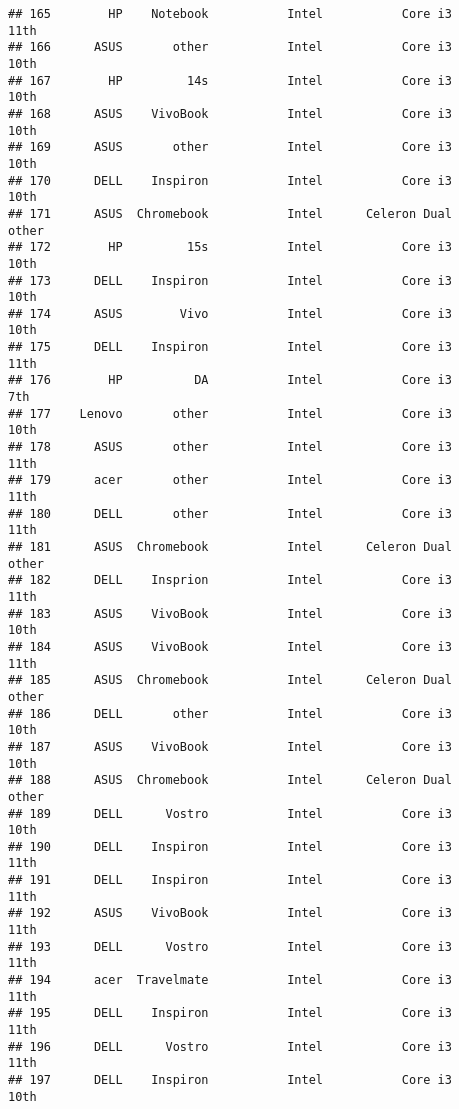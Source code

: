 \documentclass[
]{article}
\begin{document}
\begin{verbatim}
## 165        HP    Notebook           Intel           Core i3            11th
## 166      ASUS       other           Intel           Core i3            10th
## 167        HP         14s           Intel           Core i3            10th
## 168      ASUS    VivoBook           Intel           Core i3            10th
## 169      ASUS       other           Intel           Core i3            10th
## 170      DELL    Inspiron           Intel           Core i3            10th
## 171      ASUS  Chromebook           Intel      Celeron Dual           other
## 172        HP         15s           Intel           Core i3            10th
## 173      DELL    Inspiron           Intel           Core i3            10th
## 174      ASUS        Vivo           Intel           Core i3            10th
## 175      DELL    Inspiron           Intel           Core i3            11th
## 176        HP          DA           Intel           Core i3             7th
## 177    Lenovo       other           Intel           Core i3            10th
## 178      ASUS       other           Intel           Core i3            11th
## 179      acer       other           Intel           Core i3            11th
## 180      DELL       other           Intel           Core i3            11th
## 181      ASUS  Chromebook           Intel      Celeron Dual           other
## 182      DELL    Insprion           Intel           Core i3            11th
## 183      ASUS    VivoBook           Intel           Core i3            10th
## 184      ASUS    VivoBook           Intel           Core i3            11th
## 185      ASUS  Chromebook           Intel      Celeron Dual           other
## 186      DELL       other           Intel           Core i3            10th
## 187      ASUS    VivoBook           Intel           Core i3            10th
## 188      ASUS  Chromebook           Intel      Celeron Dual           other
## 189      DELL      Vostro           Intel           Core i3            10th
## 190      DELL    Inspiron           Intel           Core i3            11th
## 191      DELL    Inspiron           Intel           Core i3            11th
## 192      ASUS    VivoBook           Intel           Core i3            11th
## 193      DELL      Vostro           Intel           Core i3            11th
## 194      acer  Travelmate           Intel           Core i3            11th
## 195      DELL    Inspiron           Intel           Core i3            11th
## 196      DELL      Vostro           Intel           Core i3            11th
## 197      DELL    Inspiron           Intel           Core i3            10th

\end{verbatim}
\end{document}
